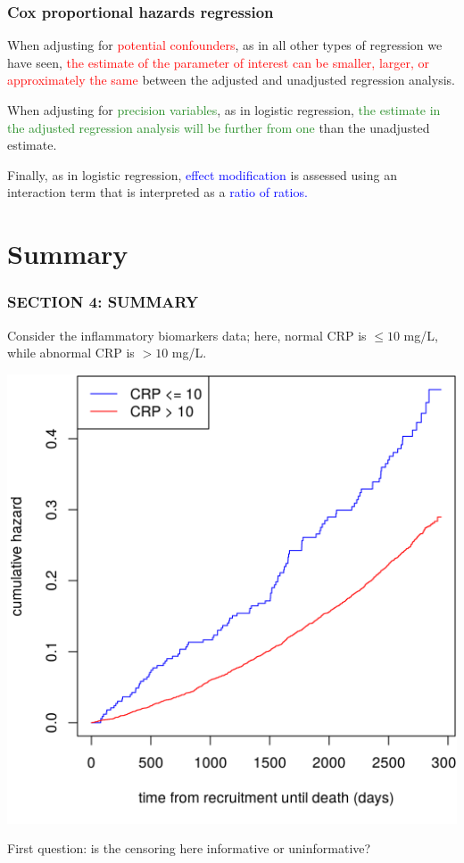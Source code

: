 \documentclass[12pt, 
hyperref={colorlinks=true, linkcolor=blue, urlcolor=cyan},dvipsnames]{beamer}
\begin{document}
\begin{frame}
\frametitle{Cox proportional hazards regression}
When adjusting for \textcolor{red}{potential confounders}, as in all other types of regression we have seen, \textcolor{red}{the estimate of the parameter of interest can be smaller, larger, or approximately the same} between the adjusted and unadjusted regression analysis.

When adjusting for \textcolor{ForestGreen}{precision variables}, as in logistic regression, \textcolor{ForestGreen}{the estimate in the adjusted regression analysis will be further from one} than the unadjusted estimate.

Finally, as in logistic regression, \textcolor{blue}{effect modification} is assessed using an interaction term that is interpreted as a \textcolor{blue}{ratio of ratios.}
\end{frame}

\section{Summary}
\begin{frame}
\frametitle{SECTION 4: SUMMARY}
Consider the inflammatory biomarkers data; here, normal CRP is $\leq 10$ mg/L, while abnormal CRP is $> 10$ mg/L.
\begin{center}
\includegraphics[height = 0.6\textheight]{figs/cum_haz_inflamm_crp.png}
\end{center} \vspace{-0.6cm}
First question: is the censoring here informative or uninformative?
\end{frame}
\end{document}
